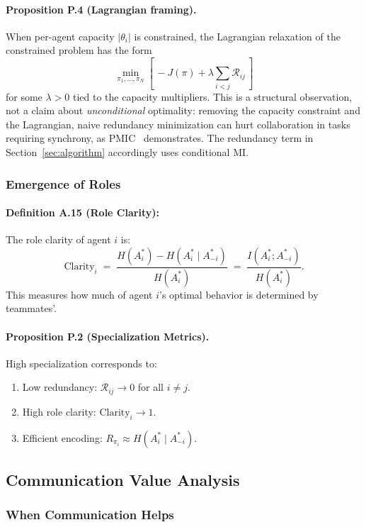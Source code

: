 \documentclass[10pt, letterpaper]{article}
\begin{document}
\paragraph{Proposition P.4 (Lagrangian framing).} When per-agent capacity $|\theta_i|$ is constrained, the Lagrangian relaxation of the constrained problem has the form
\[\min_{\pi_1,\ldots,\pi_N} \left[\, -J(\pi) + \lambda \sum_{i<j} \mathcal{R}_{ij} \,\right]\]
for some $\lambda > 0$ tied to the capacity multipliers. This is a structural observation, not a claim about \emph{unconditional} optimality: removing the capacity constraint and the Lagrangian, naive redundancy minimization can hurt collaboration in tasks requiring synchrony, as PMIC~\cite{li2022pmic} demonstrates. The redundancy term in Section~\ref{sec:algorithm} accordingly uses conditional MI.

\subsubsection{Emergence of Roles}

\paragraph{Definition A.15 (Role Clarity):} The role clarity of agent $i$ is:
\[\text{Clarity}_i \;=\; \frac{H(A_i^*) - H(A_i^* \mid A_{-i}^*)}{H(A_i^*)} \;=\; \frac{I(A_i^*; A_{-i}^*)}{H(A_i^*)}.\]
This measures how much of agent $i$'s optimal behavior is determined by teammates'.

\paragraph{Proposition P.2 (Specialization Metrics).} High specialization corresponds to:
\begin{enumerate}
    \item Low redundancy: $\mathcal{R}_{ij} \to 0$ for all $i \neq j$.
    \item High role clarity: $\text{Clarity}_i \to 1$.
    \item Efficient encoding: $R_{\pi_i} \approx H(A_i^* \mid A_{-i}^*)$.
\end{enumerate}

\subsection{Communication Value Analysis}

\subsubsection{When Communication Helps}
\end{document}
